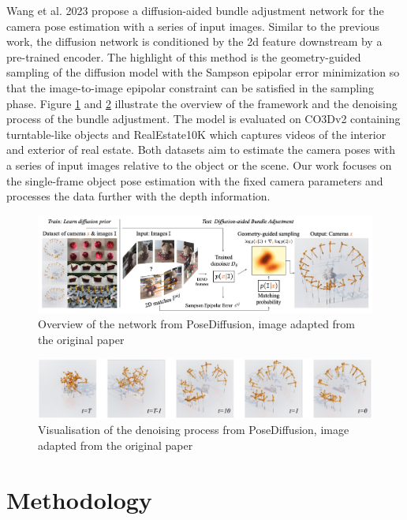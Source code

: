 \documentclass[12pt,DIV14,BCOR12mm,a4paper,footinclude=false,headinclude,parskip=half-,twoside,openright,cleardoublepage=empty,toc=index,bibliography=totoc,listof=totoc]{scrreprt}
\numberwithin{equation}{chapter}
\begin{document}
Wang et al. 2023 \cite{wang2023pd} propose a diffusion-aided bundle adjustment network for the camera pose estimation with a series of input images. Similar to the previous work, the diffusion network is conditioned by the \gls{2d} feature downstream by a pre-trained encoder. The highlight of this method is the geometry-guided sampling of the diffusion model with the Sampson epipolar error minimization so that the image-to-image epipolar constraint can be satisfied in the sampling phase. Figure \ref{img:pose_diff} and \ref{img:pose_diff_vis} illustrate the overview of the framework and the denoising process of the bundle adjustment. The model is evaluated on CO3Dv2 \cite{reizenstein2021common} containing turntable-like objects and RealEstate10K \cite{zhou2018stereo} which captures videos of the interior and exterior of real estate. Both datasets aim to estimate the camera poses with a series of input images relative to the object or the scene. Our work focuses on the single-frame object pose estimation with the fixed camera parameters and processes the data further with the depth information.

\begin{figure}[h]
	\centering
	\includegraphics[width=1.\textwidth]{img/pose_diff.png}
	\caption{Overview of the network from PoseDiffusion, image adapted from the original paper \cite{wang2023pd}}
	\label{img:pose_diff}
\end{figure}

\begin{figure}[h]
	\centering
	\includegraphics[width=1.\textwidth]{img/pose_diff_vis.pdf}
	\caption{Visualisation of the denoising process from PoseDiffusion, image adapted from the original paper \cite{wang2023pd}}
	\label{img:pose_diff_vis}
\end{figure}

\chapter{Methodology}
\end{document}
